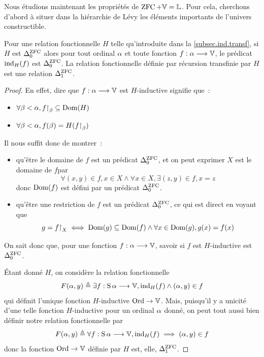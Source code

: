Nous étudions maintenant les propriétés de $\operatorname{ZFC}+\mathbb V = \mathbb L$. Pour cela, cherchons
d'abord à situer dans la hiérarchie de Lévy les éléments importants de l'univers
constructible.

\begin{property}
  Pour une relation fonctionnelle $H$ telle qu'introduite dans la
  \cref{subsec.ind.transf}, si $H$ est $\Delta_{0}^{\operatorname{ZFC}}$ alors pour tout ordinal
  $\alpha$ et toute fonction $f : \displaystyle \alpha \longrightarrow \mathbb V$, le prédicat
  $\operatorname{ind}_H(f)$ est $\Delta_{0}^{\operatorname{ZFC}}$. La relation fonctionnelle définie par récursion
  transfinie par $H$ est une relation $\Delta_{1}^{\operatorname{ZFC}}$.
\end{property}

\begin{proof}
  En effet, dire que $f : \displaystyle \alpha \longrightarrow \mathbb V$ est $H$-inductive signifie
  que~:
  \begin{itemize}
  \item $\forall \beta < \alpha, f\mathbin{\upharpoonright}_{\beta}\subseteq \operatorname{Dom}(H)$
  \item $\forall \beta < \alpha, f(\beta) = H(f\mathbin{\upharpoonright}_{\beta})$
  \end{itemize}
  Il nous suffit donc de montrer~:
  \begin{itemize}
  \item qu'être le domaine de $f$ est un prédicat $\Delta_{0}^{\operatorname{ZFC}}$, et on peut
    exprimer \og $X$ est le domaine de $f$\fg par
    \[\forall (x,y)\in f, x\in X \land \forall x \in X, \exists (z,y)\in f,
    x = z\]
    donc $\operatorname{Dom}(f)$ est défini par un prédicat $\Delta_{0}^{\operatorname{ZFC}}$.
  \item qu'être une restriction de $f$ est un prédicat $\Delta_{0}^{\operatorname{ZFC}}$, ce qui est
    direct en voyant que
    \[g = f\mathbin{\upharpoonright}_{X} \iff \operatorname{Dom}(g)\subseteq\operatorname{Dom}(f)\land
    \forall x \in \operatorname{Dom}(g), g(x)=f(x)\]
  \end{itemize}
  On sait donc que, pour une fonction $f : \displaystyle \alpha \longrightarrow \mathbb V$, savoir si
  $f$ est $H$-inductive est $\Delta_{0}^{\operatorname{ZFC}}$.

  \'Etant donné $H$, on considère la relation fonctionnelle
  \[F(\alpha,y) \triangleq \exists f : \displaystyle \operatorname{S} \alpha \longrightarrow \mathbb V,
  \operatorname{ind}_H(f) \land (\alpha,y) \in f\]
  qui définit l'unique fonction $H$-inductive $\operatorname{Ord} \to \mathbb V$. Mais, puisqu'il
  y a unicité d'une telle fonction $H$-inductive pour un ordinal $\alpha$
  donné, on peut tout aussi bien définir notre relation fonctionnelle par
  \[F(\alpha,y) \triangleq \forall f : \displaystyle \operatorname{S} \alpha \longrightarrow \mathbb V,
  \operatorname{ind}_H(f) \implies (\alpha,y) \in f\]
  donc la fonction $\operatorname{Ord} \to \mathbb V$ définie par $H$ est, elle, $\Delta_{1}^{\operatorname{ZFC}}$.
\end{proof}

